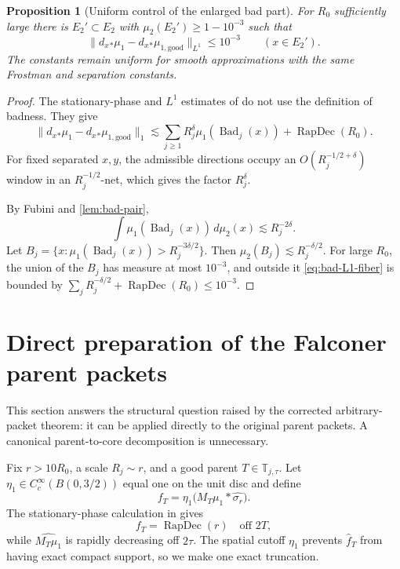 \documentclass[11pt,letterpaper]{amsart}
\newtheorem{proposition}[proposition]{Proposition}
\newcommand{\RapDec}{\operatorname{RapDec}}
\newcommand{\wh}{\widehat}
\newcommand{\norm}[1]{\lVert#1\rVert}
\begin{document}
\begin{proposition}[Uniform control of the enlarged bad part]
\label{prop:bad-L1}
For \(R_0\) sufficiently large there is \(E_2'\subset E_2\) with
\(\mu_2(E_2')\ge1-10^{-3}\) such that
\[
 \norm{d_x{}_*\mu_1-d_x{}_*\mu_{1,\mathrm{good}}}_{L^1}
 \le10^{-3}\qquad(x\in E_2').
\]
The constants remain uniform for smooth approximations with the same
Frostman and separation constants.
\end{proposition}

\begin{proof}
The stationary-phase and \(L^1\) estimates of
\cite[Lemmas~3.1--3.4]{GIOW} do not use the definition of badness.  They give
\begin{equation}\label{eq:bad-L1-fiber}
 \norm{d_x{}_*\mu_1-d_x{}_*\mu_{1,\mathrm{good}}}_{1}
 \lesssim
 \sum_{j\ge1}R_j^\delta\mu_1(\operatorname{Bad}_j(x))
 +\RapDec(R_0).
\end{equation}
For fixed separated \(x,y\), the admissible directions occupy an
\(O(R_j^{-1/2+\delta})\) window in an \(R_j^{-1/2}\)-net, which gives the
factor \(R_j^\delta\).

By Fubini and \cref{lem:bad-pair},
\[
 \int\mu_1(\operatorname{Bad}_j(x))\,d\mu_2(x)
 \lesssim R_j^{-2\delta}.
\]
Let
\(B_j=\{x:\mu_1(\operatorname{Bad}_j(x))>R_j^{-3\delta/2}\}\).
Then \(\mu_2(B_j)\lesssim R_j^{-\delta/2}\).  For large \(R_0\), the union
of the \(B_j\) has measure at most \(10^{-3}\), and outside it
\eqref{eq:bad-L1-fiber} is bounded by
\(\sum_jR_j^{-\delta/2}+\RapDec(R_0)\le10^{-3}\).
\end{proof}

\section{Direct preparation of the Falconer parent packets}
\label{sec:direct-parents}

This section answers the structural question raised by the corrected
arbitrary-packet theorem: it can be applied directly to the original parent
packets.  A canonical parent-to-core decomposition is unnecessary.

Fix \(r>10R_0\), a scale \(R_j\sim r\), and a good parent
\(T\in\mathbb T_{j,\tau}\).  Let
\(\eta_1\in C_c^\infty(B(0,3/2))\) equal one on the unit disc and define
\begin{equation}\label{eq:parent-fT}
 f_T=\eta_1\bigl(M_T\mu_1*\wh{\sigma_r}\bigr).
\end{equation}
The stationary-phase calculation in \cite[p.~33]{GIOW} gives
\[
 f_T=\RapDec(r)\quad\text{off }2T,
\]
while \(\wh{M_T\mu_1}\) is rapidly decreasing off \(2\tau\).
The spatial cutoff \(\eta_1\) prevents \(\wh f_T\) from having exact compact
support, so we make one exact truncation.
\end{document}
